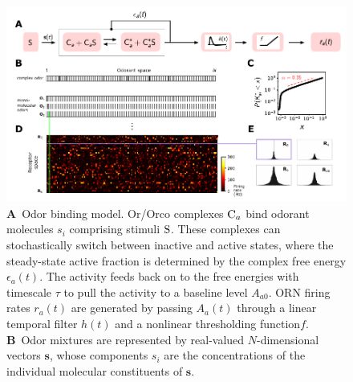 \documentclass[9pt,twocolumn,twoside,lineno]{pnas-new}
\begin{document}
\begin{figure}[!tb]
	\centering
	\begin{subfigure}[t]{\linewidth}
		\label{fig:tuning_curves_a}
	\end{subfigure}
	\begin{subfigure}[t]{0\linewidth}
		\label{fig:tuning_curves_b}
	\end{subfigure}
	\begin{subfigure}[t]{0\linewidth}
		\label{fig:tuning_curves_c}
	\end{subfigure}
	\begin{subfigure}[t]{0\linewidth}
		\label{fig:tuning_curves_d}
	\end{subfigure}
	\begin{subfigure}[t]{0\linewidth}
		\label{fig:tuning_curves_e}
	\end{subfigure}
	\begin{subfigure}[t]{0\linewidth}
		\label{fig:tuning_curves_f}
	\end{subfigure}
	\includegraphics[width=\linewidth]{figures/1_tuning_curves}
	\caption{\footnotesize{
		\textbf{A}~Odor binding model. Or/Orco complexes $\textup{C}_a$ bind odorant molecules $s_i$ comprising stimuli $\textup{S}$. These complexes can stochastically switch between inactive and active states, where the steady-state active fraction is determined by the complex free energy $\epsilon_a(t)$. The activity feeds back on to the free energies with timescale $\tau$ to pull the activity to a baseline level $A_{a0}$. ORN firing rates $r_a(t)$ are generated by passing $A_a(t)$ through a linear temporal filter $h(t)$ and a nonlinear thresholding function$f$. 
		\textbf{B}~Odor mixtures are represented by real-valued $N$-dimensional vectors $\mathbf s$, whose components $s_i$ are the concentrations of  the individual molecular constituents  of $\mathbf s$. 
}}
\end{figure}
\end{document}
